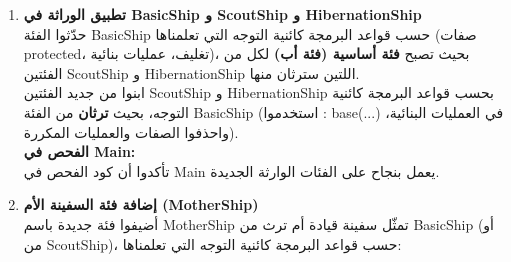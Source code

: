 \documentclass[14pt]{extarticle}
\begin{document}
\begin{enumerate}[label=\textbf{تمرين \arabic*:}, wide=0pt, leftmargin=*, itemsep=2.2em]

    \item \textbf{تطبيق الوراثة في \textenglish{BasicShip} و \textenglish{ScoutShip} و \textenglish{HibernationShip}} \\
    حدّثوا الفئة \textenglish{BasicShip} حسب قواعد البرمجة كائنية التوجه التي تعلمناها (صفات \textenglish{protected}، تغليف، عمليات بنائية)، بحيث تصبح \textbf{فئة أساسية (فئة أب)} لكل من الفئتين \textenglish{ScoutShip} و \textenglish{HibernationShip} اللتين سترثان منها. \\
    ابنوا من جديد الفئتين \textenglish{ScoutShip} و \textenglish{HibernationShip} بحسب قواعد البرمجة كائنية التوجه، بحيث \textbf{ترثان} من الفئة \textenglish{BasicShip} (استخدموا \textenglish{: base(...)} في العمليات البنائية، واحذفوا الصفات والعمليات المكررة). \\
    \textbf{الفحص في \textenglish{Main}:} \\
    تأكدوا أن كود الفحص في \textenglish{Main} يعمل بنجاح على الفئات الوارثة الجديدة.

    \item \textbf{إضافة فئة السفينة الأم (\textenglish{MotherShip})} \\
    أضيفوا فئة جديدة باسم \textenglish{MotherShip} تمثّل سفينة قيادة أم ترث من \textenglish{BasicShip} (أو من \textenglish{ScoutShip})، حسب قواعد البرمجة كائنية التوجه التي تعلمناها:


\end{enumerate}
\end{document}
